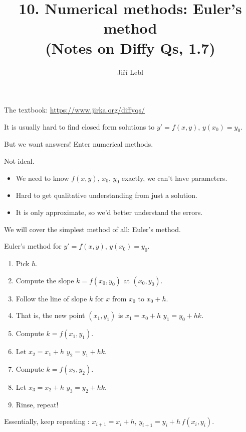 \documentclass[10pt,aspectratio=169]{beamer}
\author{Ji\v{r}\'i Lebl}
\institute[OSU]{%
Oklahoma State University%
}
\title{10. Numerical methods: Euler's method\\(Notes on Diffy Qs, 1.7)}
\date{}
\begin{document}
\begin{frame}
\titlepage


\begin{center}
The textbook: \url{https://www.jirka.org/diffyqs/}
\end{center}
\end{frame}

\begin{frame}
It is usually hard to find closed form solutions to
\quad
$y' = f(x,y)$, \quad $y(x_0) = y_0$.

\medskip
\pause

But we want answers!
\pause
\quad
Enter numerical methods.

\medskip
\pause

Not ideal.

\begin{itemize}
\item \pause
We need to know $f(x,y)$, $x_0$, $y_0$ exactly, we can't have parameters.
\item \pause
Hard to get qualitative understanding from just a solution.
\item \pause
It is only approximate, so we'd better understand the errors.
\end{itemize}

\pause
\medskip

We will cover the simplest method of all: Euler's method.

\end{frame}

\begin{frame}

Euler's method for \quad
$y' = f(x,y)$, \quad $y(x_0) = y_0$.

\begin{enumerate}
\item
Pick $h$.
\item
Compute the slope $k = f(x_0,y_0)$ at $(x_0,y_0)$.
\item
Follow the line of slope $k$ for $x$ from $x_0$ to $x_0+h$.
\item
That is, the new point $(x_1,y_1)$ is \quad
$x_1 = x_0+h$ \quad $y_1 = y_0 + h k$.
\item
Compute $k = f(x_1,y_1)$.
\item
Let $x_2 = x_1+h$ \quad $y_2 = y_1 + h k$.
\item
Compute $k = f(x_2,y_2)$.
\item
Let $x_3 = x_2+h$ \quad $y_3 = y_2 + h k$.
\item
Rinse, repeat!
\end{enumerate}

\pause
Essentially, keep repeating : \quad $x_{i+1} = x_i + h$, \quad $y_{i+1}  = y_i + h\, f(x_i,y_i)$.
\end{frame}
\end{document}
